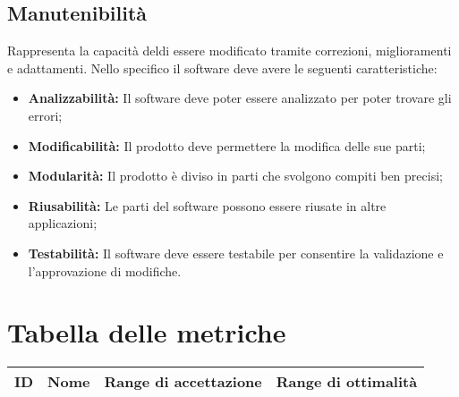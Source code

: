 \subsection{Manutenibilità}
Rappresenta la capacità deldi essere modificato tramite correzioni, miglioramenti e adattamenti.
Nello specifico il software deve avere le seguenti caratteristiche:
\begin{itemize}
	\item \textbf{Analizzabilità:} Il software deve poter essere analizzato per poter trovare gli errori;
	\item \textbf{Modificabilità:} Il prodotto deve permettere la modifica delle sue parti;
	\item \textbf{Modularità:} Il prodotto è diviso in parti che svolgono compiti ben precisi;
	\item \textbf{Riusabilità:} Le parti del software possono essere riusate in altre applicazioni;
	\item \textbf{Testabilità:} Il software deve essere testabile per consentire la validazione e l'approvazione di modifiche.
\end{itemize}	

\section{Tabella delle metriche}
\begin{center}
	\begin{tabularx}{\textwidth}{|c|c|c|c|}
		\hline 
		\textbf{ID} & \textbf{Nome} & \textbf{Range di accettazione}  & \textbf{Range di ottimalità}  \\ 
		\hline
	\end{tabularx}
\end{center}